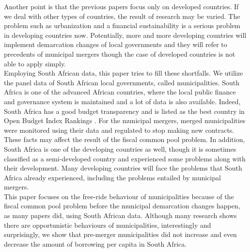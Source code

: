 \documentclass[dvipdfmx]{jsarticle}
\begin{document}
\quad Another point is that the previous papers focus only on developed countries. If we deal with other types of countries, the result of research may be varied. The problem such as urbanization and a financial sustainability is a serious problem in developing countries now. Potentially, more and more developing countries will implement demarcation changes of local governments and they will refer to precedents of municipal mergers though the case of developed countries is not able to apply simply.\\
\quad Employing South African data, this paper tries to fill these shortfalls. We utilize the panel data of South African local governments, called municipalities. South Africa is one of the advanced African countries, where the local public finance and governance system is maintained and a lot of data is also available. Indeed, South Africa has a good budget transparency and is listed as the best country in Open Budget Index Rankings \citep{IBP2017}. For the municipal mergers, merged municipalities were monitored using their data and regulated to stop making new contracts. These facts may affect the result of the fiscal common pool problem. In addition, South Africa is one of the developing countries as well, though it is sometimes classified as a semi-developed country and experienced some problems along with their development. Many developing countries will face the problems that South Africa already experienced, including the problems entailed by municipal mergers.\\
\quad This paper focuses on the free-ride behaviour of municipalities because of the fiscal common pool problem before the municipal demarcation changes happen, as many papers did, using South African data. Although many research shows there are opportunistic behaviours of municipalities, interestingly and surprisingly, we show that pre-merger municipalities did not increase and even decrease the amount of borrowing per capita in South Africa.\\
\end{document}
